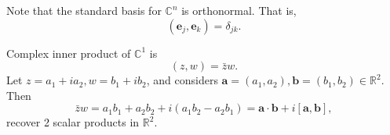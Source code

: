 \documentclass[10pt]{article}
\begin{document}
    Note that the standard basis for $ \mathbb{C}^{n} $ is orthonormal. That is,
    \[
        (\mathbf{e}_j,\mathbf{e}_k)=\delta_{jk}
    .\]
    \begin{example}
        Complex inner product of $ \mathbb{C}^{1} $ is 
        \[
            (z,w)=\bar{z}w 
        .\]
        Let $ z=a_1+ia_2,w=b_1+ib_2 $, and considers $ \mathbf{a}=(a_1,a_2),\mathbf{b}=(b_1,b_2)\in \mathbb{R}^{2} $. Then 
        \[
            \bar{z}w=a_1b_1+a_2b_2+i(a_1b_2-a_2b_1)=\mathbf{a}\cdot \mathbf{b}+i[\mathbf{a},\mathbf{b}]
        ,\]
        recover 2 scalar products in $ \mathbb{R}^2 $.
    \end{example}
\end{document}
